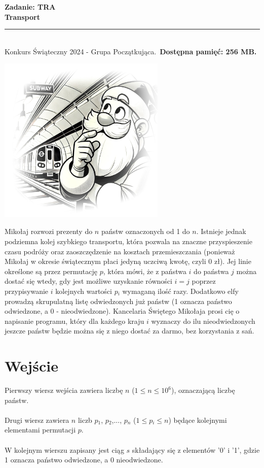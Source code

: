 \documentclass[a4paper,11pt]{article}
\newcommand{\tasktitle}{Transport}
\newcommand{\taskshort}{TRA}
\newcommand{\contestinfo}{Konkurs Świąteczny 2024 - Grupa Początkująca.}
\newcommand{\memorylimit}{256 MB}
\begin{document}
\noindent\textbf{\LARGE Zadanie: \taskshort} \\
\textbf{\Large \tasktitle} \\
\rule{\textwidth}{0.4pt} \\
\small \contestinfo \
\textbf{Dostępna pamięć: \memorylimit.}

\begin{center}
\includegraphics[width=0.6\textwidth]{transport_zdj_1.jpg} %
\end{center}

\noindent Mikołaj rozwozi prezenty do $n$ państw oznaczonych od 1 do $n$. Istnieje jednak podziemna kolej szybkiego transportu, która pozwala na znaczne przyspieszenie czasu podróży oraz zaoszczędzenie na kosztach przemieszczania (ponieważ Mikołaj w okresie świątecznym płaci jedyną uczciwą kwotę, czyli 0 zł). Jej linie określone są przez permutację $p$, która mówi, że z państwa $i$ do państwa $j$ można dostać się wtedy, gdy jest możliwe uzyskanie równości $i=j$ poprzez przypisywanie $i$ kolejnych wartości $p{_i}$ wymaganą ilość razy. Dodatkowo elfy prowadzą skrupulatną listę odwiedzonych już państw (1 oznacza państwo odwiedzone, a 0 - nieodwiedzone). Kancelaria Świętego Mikołaja prosi cię o napisanie programu, który dla każdego kraju $i$ wyznaczy do ilu nieodwiedzonych jeszcze państw będzie można się z niego dostać za darmo, bez korzystania z sań.

\section*{Wejście}
Pierwszy wiersz wejścia zawiera liczbę $n$ ($1 \leq n \leq 10^6$), oznaczającą liczbę państw.\\\\Drugi wiersz zawiera $n$ liczb $p{_1}$, $p{_2}$,..., $p{_n}$ ($1 \leq p{_i} \leq n$) będące kolejnymi elementami permutacji $p$.\\\\W kolejnym wierszu zapisany jest ciąg $s$ składający się z elementów '0' i '1', gdzie 1 oznacza państwo odwiedzone, a 0 nieodwiedzone.
\end{document}
